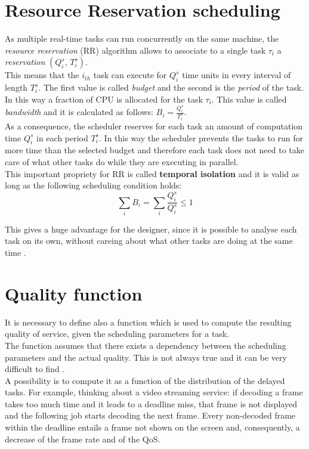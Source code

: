 \section{Resource Reservation scheduling}
As multiple real-time tasks can run concurrently on the same machine, the \emph{resource reservation} (RR) algorithm allows to associate to a single task \( \tau_{i} \) a \emph{reservation} \( \left(Q_{i}^s,\,T_{i}^s\right) \).\\ 
This means that the \( i_{th} \) task can execute for \( Q_{i}^s \) time units in every interval of length \( T_{i}^s \). The first value is called \emph{budget} and the second is the \emph{period} of the task.\\
In this way a fraction of CPU is allocated for the task \( \tau_{i} \). This value is called \emph{bandwidth} and it is calculated as follows: \( B_{i} = \frac{Q_{i}^s}{T_{i}^s}\).\\
As a consequence, the scheduler reserves for each task an amount of computation time \( Q_{i}^s \) in each period \( T_{i}^s \). In this way the scheduler prevents the tasks to run for more time than the selected budget and therefore each task does not need to take care of what other tasks do while they are executing in parallel.\\
This important propriety for RR is called \textbf{temporal isolation} and it is valid as long as the following scheduling condition holds:
\begin{equation} \tag{1} \label{schedCond}
  \displaystyle\sum_{i} B_{i} =  \displaystyle\sum_{i} \frac{Q_{i}^s}{Q_{i}^s} \leq 1
\end{equation}

This gives a huge advantage for the designer, since it is possible to analyse each task on its own, without careing about what other tasks are doing at the same time \cite{probGuarantees}.

\section{Quality function}
It is necessary to define also a function which is used to compute the resulting quality of service, given the scheduling parameters for a task.\\
The function assumes that there exists a dependency between the scheduling parameters and the actual quality. This is not always true and it can be very difficult to find \cite{prosit}.\\
A possibility is to compute it as a function of the distribution of the delayed tasks. For example, thinking about a video streaming service: if decoding a frame takes too much time and it leads to a deadline miss, that frame is not displayed and the following job starts decoding the next frame. Every non-decoded frame within the deadline entails a frame not shown on the screen and, consequently, a decrease of the frame rate and of the QoS. 

